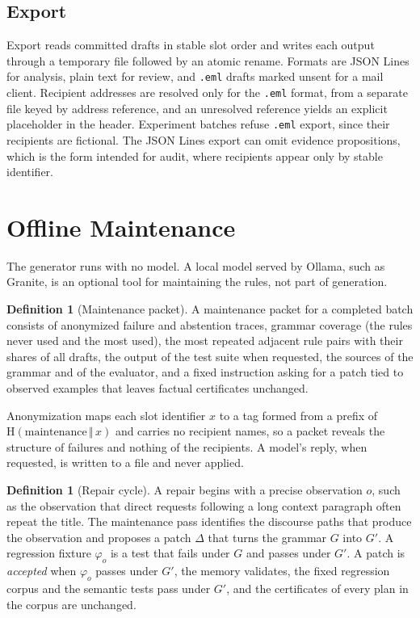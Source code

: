 \documentclass[11pt]{article}
\theoremstyle{definition}
\newtheorem{definition}[theorem]{Definition}
\theoremstyle{remark}
\newcommand{\Hash}{\mathrm{H}}
\newcommand{\code}[1]{\texttt{#1}}
\begin{document}
\subsection{Export}

Export reads committed drafts in stable slot order and writes each output through a temporary file followed by an atomic rename. Formats are JSON Lines for analysis, plain text for review, and \code{.eml} drafts marked unsent for a mail client. Recipient addresses are resolved only for the \code{.eml} format, from a separate file keyed by address reference, and an unresolved reference yields an explicit placeholder in the header. Experiment batches refuse \code{.eml} export, since their recipients are fictional. The JSON Lines export can omit evidence propositions, which is the form intended for audit, where recipients appear only by stable identifier.

\section{Offline Maintenance}\label{sec:maint}

The generator runs with no model. A local model served by Ollama, such as Granite, is an optional tool for maintaining the rules, not part of generation.

\begin{definition}[Maintenance packet]
A maintenance packet for a completed batch consists of anonymized failure and abstention traces, grammar coverage (the rules never used and the most used), the most repeated adjacent rule pairs with their shares of all drafts, the output of the test suite when requested, the sources of the grammar and of the evaluator, and a fixed instruction asking for a patch tied to observed examples that leaves factual certificates unchanged.
\end{definition}

Anonymization maps each slot identifier $x$ to a tag formed from a prefix of $\Hash(\text{maintenance}\,\Vert\,x)$ and carries no recipient names, so a packet reveals the structure of failures and nothing of the recipients. A model's reply, when requested, is written to a file and never applied.

\begin{definition}[Repair cycle]\label{def:repair}
A repair begins with a precise observation $o$, such as the observation that direct requests following a long context paragraph often repeat the title. The maintenance pass identifies the discourse paths that produce the observation and proposes a patch $\Delta$ that turns the grammar $G$ into $G'$. A regression fixture $\varphi_o$ is a test that fails under $G$ and passes under $G'$. A patch is \emph{accepted} when $\varphi_o$ passes under $G'$, the memory validates, the fixed regression corpus and the semantic tests pass under $G'$, and the certificates of every plan in the corpus are unchanged.
\end{definition}
\end{document}
